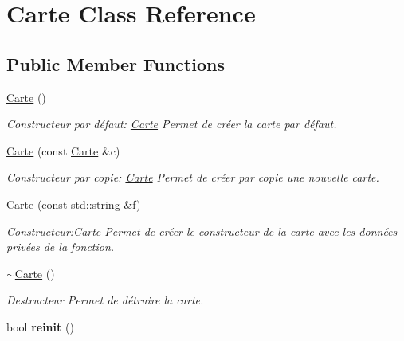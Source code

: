 \hypertarget{classCarte}{}\section{Carte Class Reference}
\label{classCarte}
\subsection*{Public Member Functions}
\begin{DoxyCompactItemize}
\item 
\hyperlink{classCarte_a06daaca86c31c80f8308f4a81d46dc9b}{Carte} ()
\begin{DoxyCompactList}\small\item\em Constructeur par défaut\+: \hyperlink{classCarte}{Carte} Permet de créer la carte par défaut. \end{DoxyCompactList}\item 
\hyperlink{classCarte_afe56c0ec89cb3cf0332755204b576a2d}{Carte} (const \hyperlink{classCarte}{Carte} \&c)
\begin{DoxyCompactList}\small\item\em Constructeur par copie\+: \hyperlink{classCarte}{Carte} Permet de créer par copie une nouvelle carte. \end{DoxyCompactList}\item 
\hyperlink{classCarte_acf6679e07683a19586bd9dc0f699d8b4}{Carte} (const std\+::string \&f)
\begin{DoxyCompactList}\small\item\em Constructeur\+:\hyperlink{classCarte}{Carte} Permet de créer le constructeur de la carte avec les données privées de la fonction. \end{DoxyCompactList}\item 
\mbox{\label{classCarte_a63300ff55c58b5d5b1674a3fc8f25910}} 
\hyperlink{classCarte_a63300ff55c58b5d5b1674a3fc8f25910}{$\sim$\+Carte} ()
\begin{DoxyCompactList}\small\item\em Destructeur Permet de détruire la carte. \end{DoxyCompactList}\item 
\mbox{\label{classCarte_a80741d7228490a91565f33977355da92}} 
bool {\bfseries reinit} ()
\item 
\mbox{\label{classCarte_ae4eaa2ff8488218767a9f68232f066d4}} 

\end{DoxyCompactItemize}
